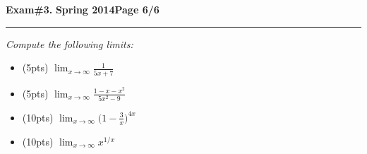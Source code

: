 \documentclass[12pt]{article}
\begin{document}
\hfill{\large\bf Exam\#3.}\hfill{\large\bf
  Spring 2014}\hfill{\large\bf Page 6/6}\hrule

\bigskip
{\problem \em Compute the following limits:}
\begin{itemize}
  \item[] (5pts) $\displaystyle{\lim_{x\to \infty} \frac{1}{5x+7}}$
  \vspace{3cm}
  \item[] (5pts) $\displaystyle{\lim_{x\to\infty} \frac{1-x-x^2}{5x^2-9}}$
  \vspace{3cm}
  \item[] (10pts) $\displaystyle{\lim_{x\to\infty} \Big(1-\frac{3}{x} \Big)^{4x}}$
  \vspace{6cm}
  \item[] (10pts) $\displaystyle{\lim_{x\to\infty} x^{1/x}}$
\end{itemize}
\end{document}
